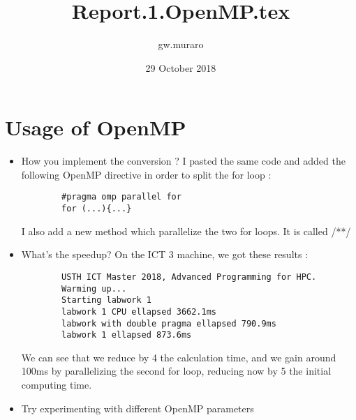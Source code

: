 \documentclass{article}
\title{Report.1.OpenMP.tex}
\author{gw.muraro }
\date{29 October 2018}
\begin{document}
\maketitle

\section{Usage of OpenMP} \newline
\begin{itemize}
    \item How you implement the conversion ? \newline
    I pasted the same code and added the following OpenMP directive in order to split the for loop : 
    \begin{verbatim}
        #pragma omp parallel for 
        for (...){...}
    \end{verbatim}
    I also add a new method which parallelize the two for loops. It is called /**/
        
    \item What’s the speedup? \newline
        On the ICT 3 machine, we got these results :
        \newline
    \begin{verbatim}
        USTH ICT Master 2018, Advanced Programming for HPC.
        Warming up...
        Starting labwork 1
        labwork 1 CPU ellapsed 3662.1ms
        labwork with double pragma ellapsed 790.9ms
        labwork 1 ellapsed 873.6ms
    \end{verbatim}
        
    We can see that we reduce by 4 the calculation time, and we gain around 100ms by parallelizing the second for loop, reducing now by 5 the initial computing time. 
    
    \item Try experimenting with different OpenMP parameters \newline
\end{itemize}
\end{document}
